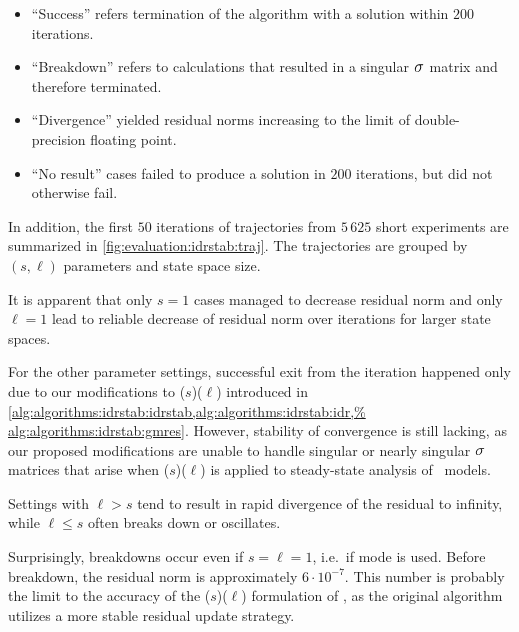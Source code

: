 \begin{itemize}
\item ``Success'' refers termination of the algorithm with a solution
within $200$ iterations.
\item ``Breakdown'' refers to calculations that resulted in a singular
$\largesigma$ matrix and therefore terminated.
\item ``Divergence'' yielded residual norms increasing to the limit of
double-precision floating point.
\item ``No result'' cases failed to produce a solution in $200$
iterations, but did not otherwise fail.
\end{itemize}

In addition, the first $50$ iterations of trajectories from $5\,625$
short experiments are summarized in
\cref{fig:evaluation:idrstab:traj}. The trajectories are grouped by
$(s, \ell)$ parameters and state space size.

It is apparent that only $s = 1$ cases managed to decrease residual
norm and only $\ell = 1$ lead to reliable decrease of residual norm
over iterations for larger state spaces.

For the other parameter settings, successful exit from the iteration
happened only due to our modifications to
($s$)($\ell$) introduced in
\vref{alg:algorithms:idrstab:idrstab,alg:algorithms:idrstab:idr,%
  alg:algorithms:idrstab:gmres}. However, stability of convergence is
still lacking, as our proposed modifications are unable to handle
singular or nearly singular $\largesigma$ matrices that arise when
($s$)($\ell$) is applied to steady-state
analysis of \CTMC\ models.

Settings with $\ell > s$ tend to result in rapid divergence of the
residual to infinity, while $\ell \le s$ often breaks down or
oscillates.

Surprisingly, breakdowns occur even if $s = \ell = 1$, i.e.~if
 mode is used. Before breakdown, the residual norm is
approximately $6 \cdot 10^{-7}$. This number is probably the limit to
the accuracy of the ($s$)($\ell$) formulation
of , as the original  algorithm
utilizes a more stable residual update strategy.

